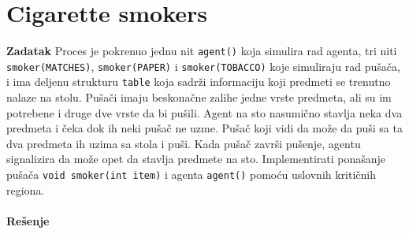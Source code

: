 \clearpage
\section{Cigarette smokers}
\textbf{\large Zadatak} Proces je pokrenuo jednu nit \texttt{agent()} koja simulira rad agenta, tri niti \texttt{smoker(MATCHES)}, \texttt{smoker(PAPER)} i \texttt{smoker(TOBACCO)} koje simuliraju rad pu\v{s}a\v{c}a, i ima deljenu strukturu \texttt{table} koja sadr\v{z}i informaciju koji predmeti se trenutno nalaze na stolu. Pu\v{s}a\v{c}i imaju beskona\v{c}ne zalihe jedne vrste predmeta, ali su im potrebene i druge dve vrste da bi pu\v{s}ili. Agent na sto nasumi\v{c}no stavlja neka dva  predmeta i \v{c}eka dok ih neki pu\v{s}a\v{c} ne uzme. Pu\v{s}a\v{c} koji vidi da mo\v{z}e da pu\v{s}i sa ta dva predmeta ih uzima sa stola i pu\v{s}i. Kada pu\v{s}a\v{c} zavr\v{s}i pu\v{s}enje, agentu signalizira da mo\v{z}e opet da stavlja predmete na sto. Implementirati pona\v{s}anje pu\v{s}a\v{c}a \texttt{void smoker(int item)} i agenta \texttt{agent()} pomo\'{c}u uslovnih kriti\v{c}nih regiona.
\\\\
\textbf{\large Re\v{s}enje}
